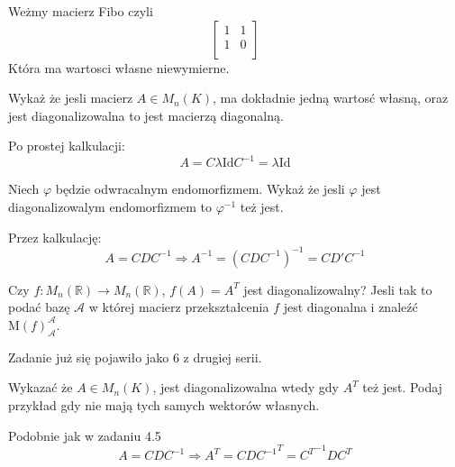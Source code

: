\documentclass[11pt]{scrartcl}
\begin{document}
   Weżmy macierz Fibo czyli
   \[
       \begin{bmatrix}
           1 & 1 \\
           1 & 0 \\
           
       \end{bmatrix}
   \]
  Która ma wartosci własne niewymierne.

  \begin{zadanie}
      Wykaż że jesli macierz $A \in M_n \left ( K \right )$, ma dokładnie jedną wartosć własną, oraz jest diagonalizowalna to jest macierzą diagonalną.
  \end{zadanie}
  
  Po prostej kalkulacji:
  \[
    A = C \lambda \text{Id} C^{-1} = \lambda \text{Id}  
  \]

  \begin{zadanie}
      Niech $\varphi$ będzie odwracalnym endomorfizmem. Wykaż że jesli $\varphi$ jest diagonalizowalym endomorfizmem to ${\varphi}^{-1} $ też jest.
  \end{zadanie}
  
  Przez kalkulację:
  \[
    A = C D C^{-1} \Rightarrow  {A}^{-1} = (CDC^{-1})^{-1} = C D' C^{-1}    
  \]
  
  \begin{zadanie}
      Czy $f : M_n \left ( \mathbb{R}  \right ) \to M_n \left ( \mathbb{R}  \right )$, $f(A) = A^T$ jest diagonalizowalny? Jesli tak to podać bazę $\mathcal{A} $ w której macierz przekształcenia $f$ jest diagonalna i znaleźć $\text{M} \left ( f \right )_{\mathcal{A}}^{\mathcal{A}}$.
  \end{zadanie}
  
  Zadanie już się pojawiło jako 6 z drugiej serii.

  \begin{zadanie}
      Wykazać że $A \in M_n \left ( K \right )$, jest diagonalizowalna wtedy gdy $A^T$ też jest. Podaj przykład gdy nie mają tych samych wektorów własnych.
  \end{zadanie}
  
  Podobnie jak w zadaniu 4.5
  \[
    A = C D C^{-1} \Rightarrow  {A}^{T} = {CDC^{-1}}^{T} = {C^T}^{-1} D C^T     
  \]
\end{document}

